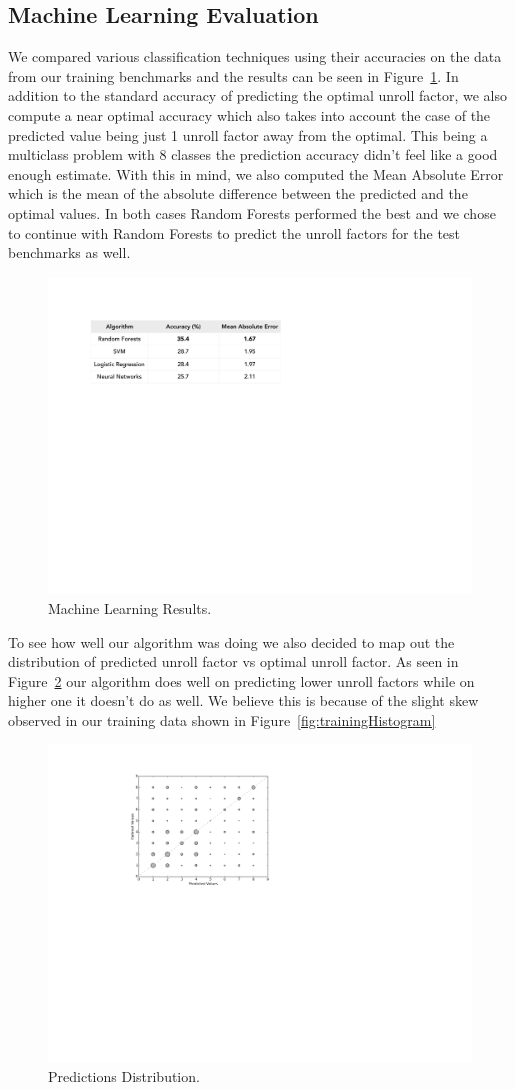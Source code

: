 \documentclass[]{sig-alternate}
\begin{document}
\subsection{Machine Learning Evaluation}
\label{subsec:MachineLearningEvaluation}

We compared various classification techniques using their accuracies on the data from our training benchmarks and the results can be seen in Figure~\ref{fig:mlResults}. In addition to the standard accuracy of predicting the optimal unroll factor, we also compute a near optimal accuracy which also takes into account the case of the predicted value being just 1 unroll factor away from the optimal. This being a multiclass problem with 8 classes the prediction accuracy didn't feel like a good enough estimate. With this in mind, we also computed the Mean Absolute Error which is the mean of the absolute difference between the predicted and the optimal values. In both cases Random Forests performed the best and we chose to continue with Random Forests to predict the unroll factors for the test benchmarks as well. 

\begin{figure}
  \includegraphics[width=0.4\linewidth]{fig/mlResults.pdf}
  \caption{Machine Learning Results.}
  \label{fig:mlResults}
\end{figure}

To see how well our algorithm was doing we also decided to map out the distribution of predicted unroll factor vs optimal unroll factor. As seen in Figure~\ref{fig:mlPredictions} our algorithm does well on predicting lower unroll factors while on higher one it doesn't do as well. We believe this is because of the slight skew observed in our training data shown in Figure~\ref{fig:trainingHistogram}

\begin{figure}
  \center
  \includegraphics[width=0.3\linewidth]{fig/mlPredictions.pdf}

  \caption{Predictions Distribution.}
  \label{fig:mlPredictions}
\end{figure}
\end{document}
